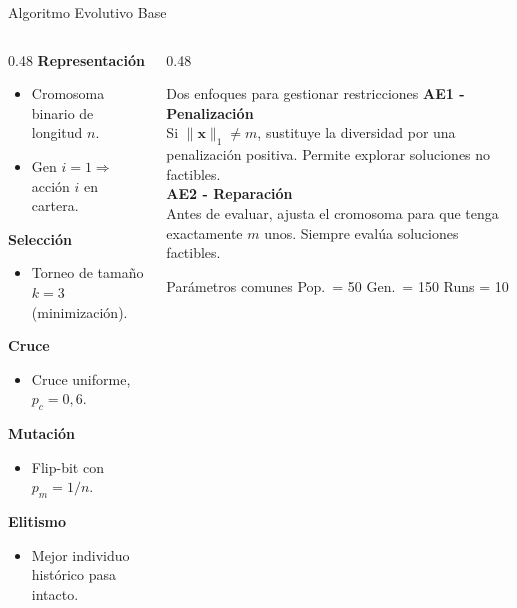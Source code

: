 \documentclass[aspectratio=169]{beamer}
\begin{document}
\begin{frame}{Algoritmo Evolutivo Base}
  \begin{columns}[T]
    \begin{column}{0.48\textwidth}
      \textbf{Representación}
      \begin{itemize}
        \item Cromosoma binario de longitud $n$.
        \item Gen $i = 1 \Rightarrow$ acción $i$ en cartera.
      \end{itemize}
      \textbf{Selección}
      \begin{itemize}
        \item Torneo de tamaño $k = 3$ (minimización).
      \end{itemize}
      \textbf{Cruce}
      \begin{itemize}
        \item Cruce uniforme, $p_c = 0{,}6$.
      \end{itemize}
      \textbf{Mutación}
      \begin{itemize}
        \item Flip-bit con $p_m = 1/n$.
      \end{itemize}
      \textbf{Elitismo}
      \begin{itemize}
        \item Mejor individuo histórico pasa intacto.
      \end{itemize}
    \end{column}
    \begin{column}{0.48\textwidth}
      \begin{block}{Dos enfoques para gestionar restricciones}
        \vspace{4pt}
        \textbf{AE1 - Penalización}\\
        Si $\|\mathbf{x}\|_1 \neq m$, sustituye la diversidad
        por una penalización positiva.
        Permite explorar soluciones no factibles.
        \\
        \vspace{8pt}
        \textbf{AE2 - Reparación}\\
        Antes de evaluar, ajusta el cromosoma para que
        tenga exactamente $m$ unos.
        Siempre evalúa soluciones factibles.
      \end{block}

      \vspace{8pt}
      \begin{block}{Parámetros comunes}
        Pop.\ = 50 \quad Gen.\ = 150 \quad Runs = 10
      \end{block}
    \end{column}
  \end{columns}
\end{frame}
\end{document}
